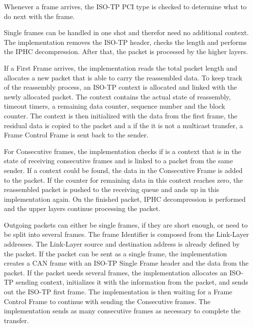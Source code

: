 Whenever a frame arrives, the ISO-TP PCI type is checked to determine what to do next with the frame.

Single frames can be handled in one shot and therefor need no additional context.
The implementation removes the ISO-TP header, checks the length and performs the IPHC decompression.
After that, the packet is processed by the higher layers.

If a First Frame arrives, the implementation reads the total packet length and allocates a new packet that is able to carry the reassembled data.
To keep track of the reassembly process, an ISO-TP context is allocated and linked with the newly allocated packet.
The context contains the actual state of reassembly, timeout timers, a remaining data counter, sequence number and the block counter.
The context is then initialized with the data from the first frame, the residual data is copied to the packet and a if the it is not a multicast transfer,
a Frame Control Frame is sent back to the sender.

For Consecutive frames, the implementation checks if is a context that is in the state of receiving consecutive frames and is linked to a packet from the same sender.
If a context could be found, the data in the Consecutive Frame is added to the packet.
If the counter for remaining data in this context reaches zero, the reassembled packet is pushed to the receiving queue and ands up in this implementation again.
On the finished packet, IPHC decompression is performed and the upper layers continue processing the packet.

Outgoing packets can either be single frames, if they are short enough, or need to be split into several frames.
The frame Identifier is composed from the Link-Layer addresses.
The Link-Layer source and destination address is already defined by the packet.
If the packet can be sent as a single frame, the implementation creates a CAN frame with an ISO-TP Single Frame header and the data from the packet.
If the packet needs several frames, the implementation allocates an ISO-TP sending context, initializes it with the information from the packet,
and sends out the ISO-TP first frame.
The implementation is then waiting for a Frame Control Frame to continue with sending the Consecutive frames.
The implementation sends as many consecutive frames as necessary to complete the transfer.
